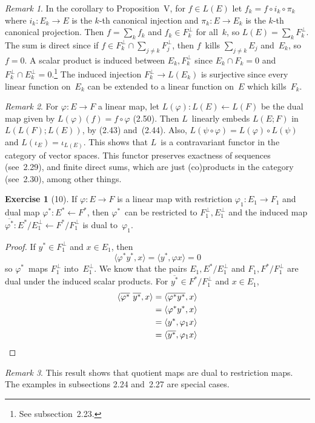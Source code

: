 \documentclass[letterpaper,12pt]{article}
\newcommand{\from}{\leftarrow}
\newcommand{\sect}{\cap}
\newcommand{\after}{\circ}
\newcommand{\sprod}[2]{\langle#1,#2\rangle}
\newcommand{\oc}[1]{#1^{\perp}}
\newcommand{\proj}[1]{\overline{#1}}
\theoremstyle{definition}
\newtheorem*{exer}{Exercise}
\theoremstyle{remark}
\newtheorem*{rmk}{Remark}
\begin{document}
\begin{rmk}
In the corollary to Proposition~V, for \(f\in L(E)\) let \(f_k=f\after i_k\after \pi_k\) where \(i_k:E_k\to E\) is the \(k\)-th canonical injection and \(\pi_k:E\to E_k\) is the \(k\)-th canonical projection. Then \(f=\sum_k f_k\) and \(f_k\in\oc{F_k}\) for all~\(k\), so \(L(E)=\sum_k\oc{F_k}\). The sum is direct since if \(f\in\oc{F_k}\sect\sum_{j\ne k}\oc{F_j}\), then \(f\)~kills \(\sum_{j\ne k}E_j\) and~\(E_k\), so \(f=0\). A scalar product is induced between \(E_k,\oc{F_k}\) since \(E_k\sect F_k=0\) and \(\oc{F_k}\sect\oc{E_k}=0\).\footnote{See subsection~2.23.} The induced injection \(\oc{F_k}\to L(E_k)\) is surjective since every linear function on~\(E_k\) can be extended to a linear function on~\(E\) which kills~\(F_k\).
\end{rmk}

\begin{rmk}
For \(\varphi:E\to F\) a linear map, let \(L(\varphi):L(E)\from L(F)\) be the dual map given by \(L(\varphi)(f)=f\after\varphi\) (2.50). Then \(L\)~linearly embeds \(L(E;F)\) in \(L(L(F);L(E))\), by (2.43) and~(2.44). Also, \(L(\psi\after\varphi)=L(\varphi)\after L(\psi)\) and \(L(\iota_{E})=\iota_{L(E)}\). This shows that \(L\)~is a contravariant functor in the category of vector spaces. This functor preserves exactness of sequences (see~2.29), and finite direct sums, which are just (co)products in the category (see~2.30), among other things.
\end{rmk}

\begin{exer}[10]
If \(\varphi:E\to F\) is a linear map with restriction \(\varphi_1:E_1\to F_1\) and dual map \(\varphi^*:E^*\from F^*\), then \(\varphi^*\)~can be restricted to \(\oc{F_1},\oc{E_1}\) and the induced map \(\proj{\varphi^*}:E^*/\oc{E_1}\from F^*/\oc{F_1}\) is dual to~\(\varphi_1\).
\end{exer}
\begin{proof}
If \(y^*\in\oc{F_1}\) and \(x\in E_1\), then
\[\sprod{\varphi^*y^*}{x}=\sprod{y^*}{\varphi x}=0\]
so \(\varphi^*\)~maps \(\oc{F_1}\) into~\(\oc{E_1}\). We know that the pairs \(E_1,E^*/\oc{E_1}\) and \(F_1,F^*/\oc{F_1}\) are dual under the induced scalar products. For \(\proj{y^*}\in F^*/\oc{F_1}\) and \(x\in E_1\),
\begin{align*}
\sprod{\proj{\varphi^*}\ \proj{y^*}}{x}&=\sprod{\proj{\varphi^* y^*}}{x}\\
	&=\sprod{\varphi^* y^*}{x}\\
	&=\sprod{y^*}{\varphi_1 x}\\
	&=\sprod{\proj{y^*}}{\varphi_1 x}\qedhere
\end{align*}
\end{proof}
\begin{rmk}
This result shows that quotient maps are dual to restriction maps. The examples in subsections 2.24 and~2.27 are special cases.
\end{rmk}
\end{document}
